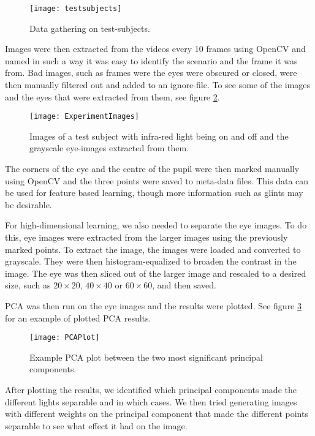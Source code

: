 \begin{figure}[h!]
\centering
\texttt{[image: testsubjects]}
\caption{Data gathering on test-subjects.}
\label{fig:testsubjects}
\end{figure}

Images were then extracted from the videos every 10 frames using OpenCV and named in such a way it was easy to identify the scenario and the frame it was from.
Bad images, such as frames were the eyes were obscured or closed, were then manually filtered out and added to an ignore-file.
To see some of the images and the eyes that were extracted from them, see figure \ref{fig:experimentimage}.

\begin{figure}[h!]
\centering
\texttt{[image: ExperimentImages]}
\caption{Images of a test subject with infra-red light being on and off and the grayscale eye-images extracted from them.}
\label{fig:experimentimage}
\end{figure}

The corners of the eye and the centre of the pupil were then marked manually using OpenCV and the three points were saved to meta-data files.
This data can be used for feature based learning, though more information such as glints may be desirable.

For high-dimensional learning, we also needed to separate the eye images.
To do this, eye images were extracted from the larger images using the previously marked points.
To extract the image, the images were loaded and converted to grayscale.
They were then histogram-equalized to broaden the contrast in the image. %
The eye was then sliced out of the larger image and rescaled to a desired size, such as $20\times 20$, $40\times 40$ or $60\times 60$, and then saved.

PCA was then run on the eye images and the results were plotted.
See figure \ref{fig:PCAPlot} for an example of plotted PCA results.

\begin{figure}[h!]
\centering
\texttt{[image: PCAPlot]}
\caption{Example PCA plot between the two most significant principal components.}
\label{fig:PCAPlot}
\end{figure}

After plotting the results, we identified which principal components made the different lights separable and in which cases.
We then tried generating images with different weights on the principal component that made the different points separable to see what effect it had on the image.